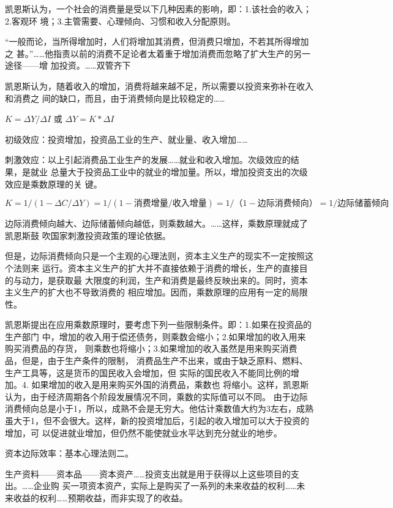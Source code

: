 凯恩斯认为，一个社会的消费量是受以下几种因素的影响，即：1.该社会的收入；2.客观环
境；3.主管需要、心理倾向、习惯和收入分配原则。

“一般而论，当所得增加时，人们将增加其消费，但消费只增加，不若其所得增加之
甚。”……他指责以前的消费不足论者太着重于增加消费而忽略了扩大生产的另一途径——增
加投资。……双管齐下 

凯恩斯认为，随着收入的增加，消费将越来越不足，所以需要以投资来弥补在收入和消费之
间的缺口，而且，由于消费倾向是比较稳定的……

$K = \Delta Y / \Delta I$ 或 $\Delta Y = K * \Delta I$

初级效应：投资增加，投资品工业的生产、就业量、收入增加……

刺激效应：以上引起消费品工业生产的发展……就业和收入增加。次级效应的结果，是就业
总量大于投资品工业中的就业的增加量。所以，增加投资支出的次级效应是乘数原理的关
键。

$ K=1/(1- \Delta C/ \Delta Y)=1/(1-消费增量/收入增量) =1/（1-边际消费倾向）=1/边际储蓄倾向$

边际消费倾向越大、边际储蓄倾向越低，则乘数越大。……这样，乘数原理就成了凯恩斯鼓
吹国家刺激投资政策的理论依据。

但是，边际消费倾向只是一个主观的心理法则，资本主义生产的现实不一定按照这个法则来
运行。资本主义生产的扩大并不直接依赖于消费的增长，生产的直接目的与动力，是获取最
大限度的利润，生产和消费是最终反映出来的。同时，资本主义生产的扩大也不导致消费的
相应增加。因而，乘数原理的应用有一定的局限性。

凯恩斯提出在应用乘数原理时，要考虑下列一些限制条件。即：1.如果在投资品的生产部门
中，增加的收入用于偿还债务，则乘数会缩小；2.如果增加的收入用来购买消费品的存货，
则乘数也将缩小；3.如果增加的收入虽然是用来购买消费品，但是，由于生产条件的限制，
消费品生产不出来，或由于缺乏原料、燃料、生产工具等，这是货币的国民收入会增加，但
实际的国民收入不能同比例的增加。4. 如果增加的收入是用来购买外国的消费品，乘数也
将缩小。这样，凯恩斯认为，由于经济周期各个阶段发展情况不同，乘数的实际值可以不同。
由于边际消费倾向总是小于1，所以，成熟不会是无穷大。他估计乘数值大约为3左右，成熟
虽大于1，但不会很大。这样，新的投资增加后，引起的收入增加可以大于投资的增加，可
以促进就业增加，但仍然不能使就业水平达到充分就业的地步。

资本边际效率：基本心理法则二。

生产资料——资本品——资本资产……投资支出就是用于获得以上这些项目的支出。……企业购
买一项资本资产，实际上是购买了一系列的未来收益的权利……未来收益的权利……预期收益，而非实现了的收益。

